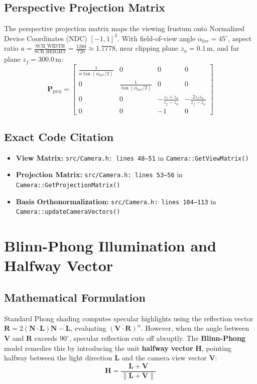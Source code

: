 \subsection{Perspective Projection Matrix}
The perspective projection matrix maps the viewing frustum onto Normalized Device Coordinates (NDC) $[-1, 1]^3$. With field-of-view angle $\alpha_{\text{fov}} = 45^\circ$, aspect ratio $a = \frac{\text{SCR\_WIDTH}}{\text{SCR\_HEIGHT}} = \frac{1280}{720} \approx 1.7778$, near clipping plane $z_n = 0.1\,\text{m}$, and far plane $z_f = 300.0\,\text{m}$:
\begin{equation}
\mathbf{P}_{\text{proj}} = \begin{bmatrix}
\frac{1}{a \tan(\alpha_{\text{fov}} / 2)} & 0 & 0 & 0 \\
0 & \frac{1}{\tan(\alpha_{\text{fov}} / 2)} & 0 & 0 \\
0 & 0 & -\frac{z_f + z_n}{z_f - z_n} & -\frac{2 z_f z_n}{z_f - z_n} \\
0 & 0 & -1 & 0
\end{bmatrix}
\label{eq:projection_matrix}
\end{equation}

\subsection{Exact Code Citation}
\begin{itemize}
    \item \textbf{View Matrix:} \texttt{src/Camera.h: lines 48--51} in \texttt{Camera::GetViewMatrix()}
    \item \textbf{Projection Matrix:} \texttt{src/Camera.h: lines 53--56} in \texttt{Camera::GetProjectionMatrix()}
    \item \textbf{Basis Orthonormalization:} \texttt{src/Camera.h: lines 104--113} in \texttt{Camera::updateCameraVectors()}
\end{itemize}

\section{Blinn-Phong Illumination and Halfway Vector}
\subsection{Mathematical Formulation}
Standard Phong shading computes specular highlights using the reflection vector $\mathbf{R} = 2(\mathbf{N}\cdot\mathbf{L})\mathbf{N} - \mathbf{L}$, evaluating $(\mathbf{V}\cdot\mathbf{R})^{\alpha}$. However, when the angle between $\mathbf{V}$ and $\mathbf{R}$ exceeds $90^\circ$, specular reflection cuts off abruptly. The \textbf{Blinn-Phong} model remedies this by introducing the unit \textbf{halfway vector} $\mathbf{H}$, pointing halfway between the light direction $\mathbf{L}$ and the camera view vector $\mathbf{V}$:
\begin{equation}
\mathbf{H} = \frac{\mathbf{L} + \mathbf{V}}{\|\mathbf{L} + \mathbf{V}\|}
\label{eq:halfway_vector}
\end{equation}

